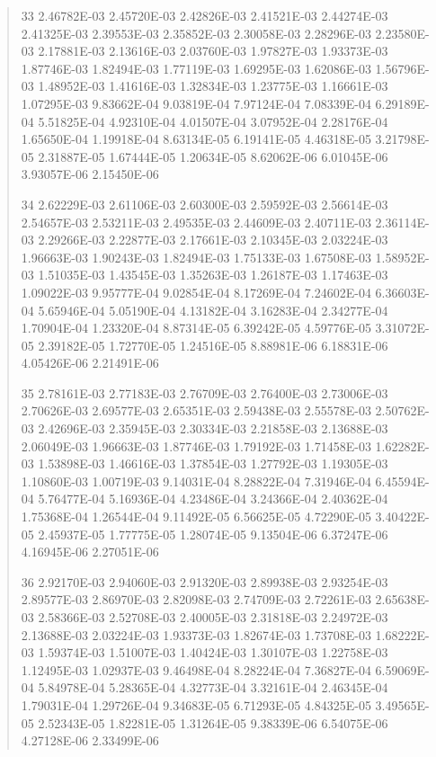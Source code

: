 \documentclass[letterpaper,10pt,english]{sphinxmanual}
\begin{document}
\begin{quote}
\begin{DUlineblock}{0em}
\item[] 33   2.46782E-03  2.45720E-03  2.42826E-03  2.41521E-03  2.44274E-03  2.41325E-03  2.39553E-03  2.35852E-03  2.30058E-03  2.28296E-03  2.23580E-03  2.17881E-03  2.13616E-03  2.03760E-03  1.97827E-03  1.93373E-03  1.87746E-03  1.82494E-03  1.77119E-03  1.69295E-03  1.62086E-03  1.56796E-03  1.48952E-03  1.41616E-03  1.32834E-03  1.23775E-03  1.16661E-03  1.07295E-03  9.83662E-04  9.03819E-04  7.97124E-04  7.08339E-04  6.29189E-04  5.51825E-04  4.92310E-04  4.01507E-04  3.07952E-04  2.28176E-04  1.65650E-04  1.19918E-04  8.63134E-05  6.19141E-05  4.46318E-05  3.21798E-05  2.31887E-05  1.67444E-05  1.20634E-05  8.62062E-06  6.01045E-06  3.93057E-06  2.15450E-06
\item[] 34   2.62229E-03  2.61106E-03  2.60300E-03  2.59592E-03  2.56614E-03  2.54657E-03  2.53211E-03  2.49535E-03  2.44609E-03  2.40711E-03  2.36114E-03  2.29266E-03  2.22877E-03  2.17661E-03  2.10345E-03  2.03224E-03  1.96663E-03  1.90243E-03  1.82494E-03  1.75133E-03  1.67508E-03  1.58952E-03  1.51035E-03  1.43545E-03  1.35263E-03  1.26187E-03  1.17463E-03  1.09022E-03  9.95777E-04  9.02854E-04  8.17269E-04  7.24602E-04  6.36603E-04  5.65946E-04  5.05190E-04  4.13182E-04  3.16283E-04  2.34277E-04  1.70904E-04  1.23320E-04  8.87314E-05  6.39242E-05  4.59776E-05  3.31072E-05  2.39182E-05  1.72770E-05  1.24516E-05  8.88981E-06  6.18831E-06  4.05426E-06  2.21491E-06
\item[] 35   2.78161E-03  2.77183E-03  2.76709E-03  2.76400E-03  2.73006E-03  2.70626E-03  2.69577E-03  2.65351E-03  2.59438E-03  2.55578E-03  2.50762E-03  2.42696E-03  2.35945E-03  2.30334E-03  2.21858E-03  2.13688E-03  2.06049E-03  1.96663E-03  1.87746E-03  1.79192E-03  1.71458E-03  1.62282E-03  1.53898E-03  1.46616E-03  1.37854E-03  1.27792E-03  1.19305E-03  1.10860E-03  1.00719E-03  9.14031E-04  8.28822E-04  7.31946E-04  6.45594E-04  5.76477E-04  5.16936E-04  4.23486E-04  3.24366E-04  2.40362E-04  1.75368E-04  1.26544E-04  9.11492E-05  6.56625E-05  4.72290E-05  3.40422E-05  2.45937E-05  1.77775E-05  1.28074E-05  9.13504E-06  6.37247E-06  4.16945E-06  2.27051E-06
\item[] 36   2.92170E-03  2.94060E-03  2.91320E-03  2.89938E-03  2.93254E-03  2.89577E-03  2.86970E-03  2.82098E-03  2.74709E-03  2.72261E-03  2.65638E-03  2.58366E-03  2.52708E-03  2.40005E-03  2.31818E-03  2.24972E-03  2.13688E-03  2.03224E-03  1.93373E-03  1.82674E-03  1.73708E-03  1.68222E-03  1.59374E-03  1.51007E-03  1.40424E-03  1.30107E-03  1.22758E-03  1.12495E-03  1.02937E-03  9.46498E-04  8.28224E-04  7.36827E-04  6.59069E-04  5.84978E-04  5.28365E-04  4.32773E-04  3.32161E-04  2.46345E-04  1.79031E-04  1.29726E-04  9.34683E-05  6.71293E-05  4.84325E-05  3.49565E-05  2.52343E-05  1.82281E-05  1.31264E-05  9.38339E-06  6.54075E-06  4.27128E-06  2.33499E-06

\end{DUlineblock}
\end{quote}
\end{document}
